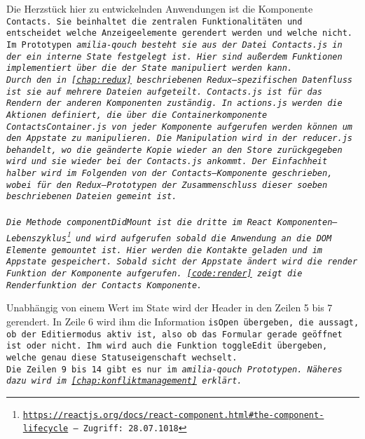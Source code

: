 Die Herzstück hier zu entwickelnden Anwendungen ist die Komponente \tt{Contacts}.
Sie beinhaltet die zentralen Funktionalitäten und entscheidet welche Anzeigeelemente gerendert werden und welche nicht.
Im Prototypen \it{amilia-qouch} besteht sie aus der Datei \tt{Contacts.js} in der ein interne State festgelegt ist.
Hier sind außerdem Funktionen implementiert über die der State manipuliert werden kann.\\
%
Durch den in \autoref{chap:redux} beschriebenen Redux--spezifischen Datenfluss ist sie auf mehrere Dateien aufgeteilt.
\tt{Contacts.js} ist für das Rendern der anderen Komponenten zuständig. 
In \tt{actions.js} werden die Aktionen definiert, die über die Containerkomponente \tt{ContactsContainer.js} von jeder Komponente aufgerufen werden können um den \gls{App}state zu manipulieren.
Die Manipulation wird in der \tt{reducer.js} behandelt, wo die geänderte Kopie wieder an den Store zurückgegeben wird und sie wieder bei der \tt{Contacts.js} ankommt.
Der Einfachheit halber wird im Folgenden von der Contacts--Komponente geschrieben, wobei für den Redux--Prototypen der Zusammenschluss dieser soeben beschriebenen Dateien gemeint ist.\\\\
%
% 
Die Methode \tt{componentDidMount} ist die dritte im React Komponenten--Lebenszyklus\footnote{ \url{https://reactjs.org/docs/react-component.html\#the-component-lifecycle} -- Zugriff: 28.07.1018} und wird aufgerufen sobald die Anwendung an die DOM Elemente gemountet ist.
Hier werden die Kontakte geladen und im \gls{App}state gespeichert.
Sobald sicht der \gls{App}state ändert wird die \tt{render} Funktion der Komponente aufgerufen. \autoref{code:render} zeigt die Renderfunktion der \tt{Contacts} Komponente.
%
\begin{center}
  
\end{center}
%
Unabhängig von einem Wert im State wird der Header in den Zeilen 5 bis 7 gerendert.
In Zeile 6 wird ihm die Information \tt{isOpen} übergeben, die aussagt, ob der Editiermodus aktiv ist, also ob das Formular gerade geöffnet ist oder nicht.
Ihm wird auch die Funktion \tt{toggleEdit} übergeben, welche genau diese Statuseigenschaft wechselt.\\
%
Die Zeilen 9 bis 14 gibt es nur im \it{amilia-qouch} Prototypen. Näheres dazu wird im \autoref{chap:konfliktmanagement} erklärt.\\
